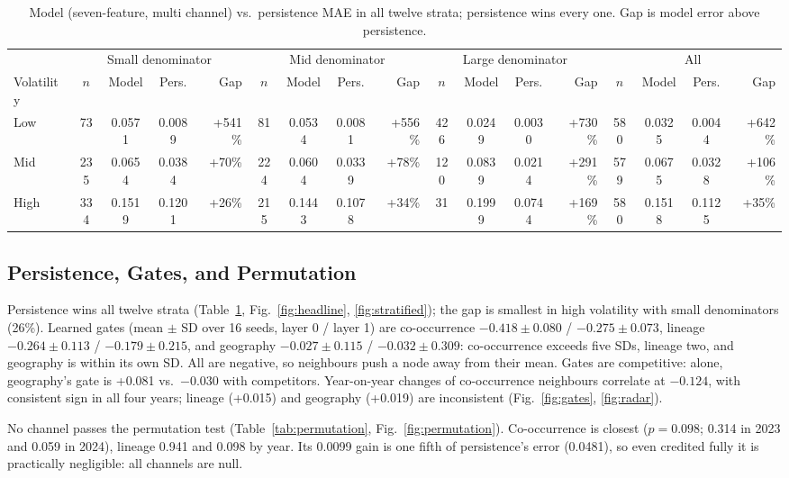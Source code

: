 \documentclass[journal]{IEEEtran}
\begin{document}
\begin{table}[!t]
\centering\footnotesize
\caption{Model (seven-feature, multi channel) vs.\ persistence MAE in all twelve strata; persistence wins every one. Gap is model error above persistence.}
\label{tab:strata}
\begin{tabular}{@{}l|cccr|cccr|cccr|cccr@{}}
\toprule
 & \multicolumn{4}{c|}{Small denominator} & \multicolumn{4}{c|}{Mid denominator} & \multicolumn{4}{c|}{Large denominator} & \multicolumn{4}{c}{All} \\
Volatility & $n$ & Model & Pers. & Gap & $n$ & Model & Pers. & Gap & $n$ & Model & Pers. & Gap & $n$ & Model & Pers. & Gap \\
\midrule
Low & 73 & 0.0571 & 0.0089 & +541\% & 81 & 0.0534 & 0.0081 & +556\% & 426 & 0.0249 & 0.0030 & +730\% & 580 & 0.0325 & 0.0044 & +642\% \\
Mid & 235 & 0.0654 & 0.0384 & +70\% & 224 & 0.0604 & 0.0339 & +78\% & 120 & 0.0839 & 0.0214 & +291\% & 579 & 0.0675 & 0.0328 & +106\% \\
High & 334 & 0.1519 & 0.1201 & +26\% & 215 & 0.1443 & 0.1078 & +34\% & 31 & 0.1999 & 0.0744 & +169\% & 580 & 0.1518 & 0.1125 & +35\% \\
\bottomrule
\end{tabular}
\end{table}

\subsection{Persistence, Gates, and Permutation}
Persistence wins all twelve strata (Table~\ref{tab:strata}, Fig.~\ref{fig:headline}, \ref{fig:stratified}); the gap is smallest in high volatility with small denominators (26\%). Learned gates (mean $\pm$ SD over 16 seeds, layer 0 / layer 1) are co-occurrence $-0.418\pm0.080$ / $-0.275\pm0.073$, lineage $-0.264\pm0.113$ / $-0.179\pm0.215$, and geography $-0.027\pm0.115$ / $-0.032\pm0.309$: co-occurrence exceeds five SDs, lineage two, and geography is within its own SD. All are negative, so neighbours push a node away from their mean. Gates are competitive: alone, geography's gate is +0.081 vs.\ $-0.030$ with competitors. Year-on-year changes of co-occurrence neighbours correlate at $-0.124$, with consistent sign in all four years; lineage (+0.015) and geography (+0.019) are inconsistent (Fig.~\ref{fig:gates}, \ref{fig:radar}).

No channel passes the permutation test (Table~\ref{tab:permutation}, Fig.~\ref{fig:permutation}). Co-occurrence is closest ($p=0.098$; 0.314 in 2023 and 0.059 in 2024), lineage 0.941 and 0.098 by year. Its 0.0099 gain is one fifth of persistence's error (0.0481), so even credited fully it is practically negligible: all channels are null.
\end{document}
